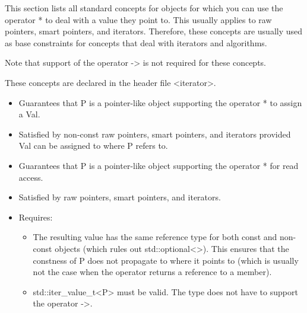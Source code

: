 
This section lists all standard concepts for objects for which you can use the operator * to deal with a value they point to. This usually applies to raw pointers, smart pointers, and iterators. Therefore, these concepts are usually used as base constraints for concepts that deal with iterators and algorithms.

Note that support of the operator -> is not required for these concepts.

These concepts are declared in the header file <iterator>.




\begin{itemize}
\item
Guarantees that P is a pointer-like object supporting the operator * to assign a Val.
	
\item
Satisfied by non-const raw pointers, smart pointers, and iterators provided Val can be assigned to where P refers to.
\end{itemize}



\begin{itemize}
\item
Guarantees that P is a pointer-like object supporting the operator * for read access.

\item
Satisfied by raw pointers, smart pointers, and iterators.


\item
Requires:
\begin{itemize}
\item
The resulting value has the same reference type for both const and non-const objects (which rules out std::optional<>). This ensures that the constness of P does not propagate to where it points to (which is usually not the case when the operator returns a reference to a member).

\item
std::iter\_value\_t<P> must be valid. The type does not have to support the operator ->.
\end{itemize}
\end{itemize}


